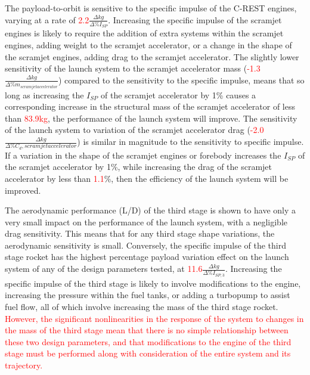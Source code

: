 The payload-to-orbit is sensitive to the specific impulse of the C-REST engines, varying at a rate of \textcolor{red}{2.2}$\frac{\Delta kg}{\Delta\%I_{SP}}$. Increasing the specific impulse of the scramjet engines is likely to require the addition of extra systems within the scramjet engines, adding weight to the scramjet accelerator, or a change in the shape of the scramjet engines, adding drag to the scramjet accelerator. 
The slightly lower sensitivity of the launch system to the scramjet accelerator mass (\textcolor{red}{-1.3}$\frac{\Delta kg}{\Delta\%m_{scramjet accelerator}}$) compared to the sensitivity to the specific impulse, means that so long as increasing the $I_{SP}$ of the scramjet accelerator by 1\% causes a corresponding increase in the structural mass of the scramjet accelerator of less than \textcolor{red}{83.9kg}, the performance of the launch system will improve. 
The sensitivity of the launch system to variation of the scramjet accelerator drag (\textcolor{red}{-2.0}$\frac{\Delta kg}{\Delta\%C_d,{scramjet accelerator}}$) is similar in magnitude to the sensitivity to specific impulse. 
If a variation in the shape of the scramjet engines or forebody increases the $I_{SP}$ of the scramjet accelerator by 1\%, while increasing the drag of the scramjet accelerator by less than \textcolor{red}{1.1}\%, then the efficiency of the launch system will be improved. 

The aerodynamic performance (L/D) of the third stage is shown to have only a very small impact on the performance of the launch system, with a negligible drag sensitivity. This means that for any third stage shape variations, the aerodynamic sensitivity is small.
 Conversely, the specific impulse of the third stage rocket has the highest percentage payload variation effect on the launch system of any of the design parameters tested, at \textcolor{red}{11.6}$\frac{\Delta kg}{\Delta\%I_{SP,3}}$. Increasing the specific impulse of the third stage is likely to involve modifications to the engine, increasing the pressure within the fuel tanks, or adding a turbopump to assist fuel flow, all of which involve increasing the mass of the third stage rocket. 
\textcolor{red}{However, the significant nonlinearities in the response of the system to changes in the mass of the third stage mean that there is no simple relationship between these two design parameters, and that modifications to the engine of the third stage must be performed along with consideration of the entire system and its trajectory.}

 








